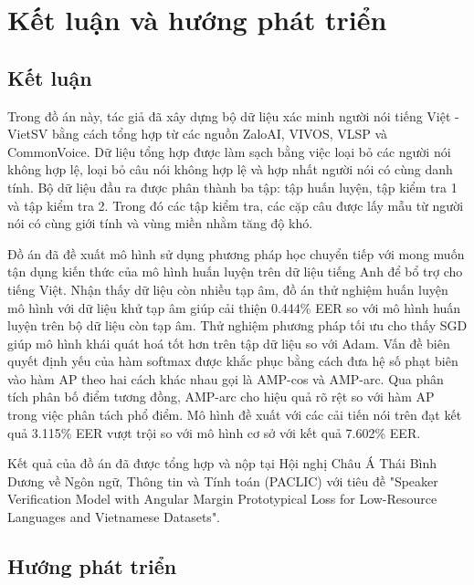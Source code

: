 \documentclass[a4paper, 13pt, oneside]{report}
\begin{document}
\printglossary[type=\acronymtype,style=long, title=List of Abbreviations]
\printglossary
\pagebreak

\setcounter{page}{1}






\chapter{Kết luận và hướng phát triển}
\section{Kết luận}
Trong đồ án này, tác giả đã xây dựng bộ dữ liệu xác minh người nói tiếng Việt - VietSV bằng cách tổng hợp từ các nguồn ZaloAI, VIVOS, VLSP và CommonVoice. Dữ liệu tổng hợp được làm sạch bằng việc loại bỏ các người nói không hợp lệ, loại bỏ câu nói không hợp lệ và hợp nhất người nói có cùng danh tính. Bộ dữ liệu đầu ra được phân thành ba tập: tập huấn luyện, tập kiểm tra 1 và tập kiểm tra 2. Trong đó các tập kiểm tra, các cặp câu được lấy mẫu từ người nói có cùng giới tính và vùng miền nhằm tăng độ khó. 

Đồ án đã đề xuất mô hình sử dụng phương pháp học chuyển tiếp với mong muốn tận dụng kiến thức của mô hình huấn luyện trên dữ liệu tiếng Anh để bổ trợ cho tiếng Việt. Nhận thấy dữ liệu còn nhiều tạp âm, đồ án thử nghiệm huấn luyện mô hình với dữ liệu khử tạp âm giúp cải thiện 0.444\% EER so với mô hình huấn luyện trên bộ dữ liệu còn tạp âm. Thử nghiệm phương pháp tối ưu cho thấy SGD giúp mô hình khái quát hoá tốt hơn trên tập dữ liệu so với Adam. Vấn đề biên quyết định yếu của hàm softmax được khắc phục bằng cách đưa hệ số phạt biên vào hàm AP theo hai cách khác nhau gọi là AMP-cos và AMP-arc. Qua phân tích phân bố điểm tương đồng, AMP-arc cho hiệu quả rõ rệt so với hàm AP trong việc phân tách phổ điểm. Mô hình đề xuất với các cải tiến nói trên đạt kết quả 3.115\% EER vượt trội so với mô hình cơ sở với kết quả 7.602\% EER.

Kết quả của đồ án đã được tổng hợp và nộp tại Hội nghị Châu Á Thái Bình Dương về Ngôn ngữ, Thông tin và Tính toán (PACLIC) với tiêu đề "Speaker Verification Model with Angular Margin Prototypical Loss for Low-Resource Languages and Vietnamese Datasets".

\section{Hướng phát triển}
\end{document}
